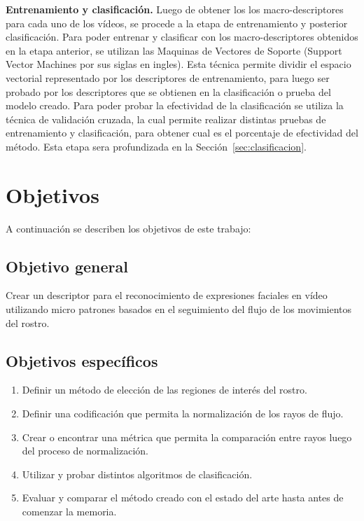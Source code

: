 \textbf{Entrenamiento y clasificación.}
Luego de obtener los los macro-des\-crip\-tores para cada uno de los vídeos, se procede a la etapa de entrenamiento y posterior clasificación. Para poder entrenar y clasificar con los macro-descriptores obtenidos en la etapa anterior, se utilizan las Maquinas de Vectores de Soporte (Support Vector Machines por sus siglas en ingles). Esta técnica permite dividir el espacio vectorial representado por los descriptores de entrenamiento, para luego ser probado por los descriptores que se obtienen en la clasificación o prueba del modelo creado. Para poder probar la efectividad de la clasificación se utiliza la técnica de validación cruzada, la cual permite realizar distintas pruebas de entrenamiento y clasificación, para obtener cual es el porcentaje de efectividad del método. Esta etapa sera profundizada en la Sección~\ref{sec:clasificacion}.


\section{Objetivos}
\label{subsec:objetivos}
A continuación se describen los objetivos de este trabajo:

\subsection{Objetivo general}
\label{subsubsec:objgeneral}
Crear un descriptor para el reconocimiento de expresiones faciales en vídeo utilizando micro patrones basados en el seguimiento del flujo de los movimientos del rostro.

\subsection{Objetivos específicos}
\label{subsubsec:objgeneral}
	\begin{enumerate}
		\item Definir un método de elección de las regiones de interés del rostro.
		\item Definir una codificación que permita la normalización de los rayos de flujo.
		\item Crear o encontrar una métrica que permita la comparación entre rayos luego del proceso de normalización.
		\item Utilizar y probar distintos algoritmos de clasificación.
		\item Evaluar y comparar el método creado con el estado del arte hasta antes de comenzar la memoria. 
	\end{enumerate}